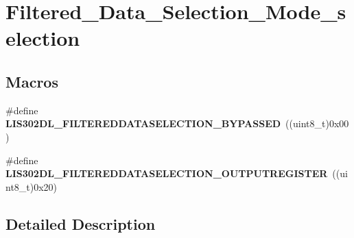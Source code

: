 \hypertarget{group___filtered___data___selection___mode__selection}{\section{Filtered\-\_\-\-Data\-\_\-\-Selection\-\_\-\-Mode\-\_\-selection}
\label{group___filtered___data___selection___mode__selection}
}
\subsection*{Macros}
\begin{DoxyCompactItemize}
\item 
\hypertarget{group___filtered___data___selection___mode__selection_ga987272d86eceb3c6028074c5a163e645}{\#define {\bfseries L\-I\-S302\-D\-L\-\_\-\-F\-I\-L\-T\-E\-R\-E\-D\-D\-A\-T\-A\-S\-E\-L\-E\-C\-T\-I\-O\-N\-\_\-\-B\-Y\-P\-A\-S\-S\-E\-D}~((uint8\-\_\-t)0x00)}\label{group___filtered___data___selection___mode__selection_ga987272d86eceb3c6028074c5a163e645}

\item 
\hypertarget{group___filtered___data___selection___mode__selection_ga0b3bbae44f61c8a0b38e1b0fd8bb7e66}{\#define {\bfseries L\-I\-S302\-D\-L\-\_\-\-F\-I\-L\-T\-E\-R\-E\-D\-D\-A\-T\-A\-S\-E\-L\-E\-C\-T\-I\-O\-N\-\_\-\-O\-U\-T\-P\-U\-T\-R\-E\-G\-I\-S\-T\-E\-R}~((uint8\-\_\-t)0x20)}\label{group___filtered___data___selection___mode__selection_ga0b3bbae44f61c8a0b38e1b0fd8bb7e66}

\end{DoxyCompactItemize}


\subsection{Detailed Description}
